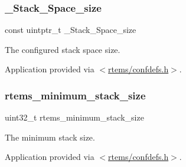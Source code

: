 \subsubsection{\texorpdfstring{\_Stack\_Space\_size}{\_Stack\_Space\_size}}
{\footnotesize\ttfamily const uintptr\+\_\+t \+\_\+\+Stack\+\_\+\+Space\+\_\+size}



The configured stack space size. 

Application provided via $<$\mbox{\hyperlink{confdefs_8h}{rtems/confdefs.\+h}}$>$. \mbox{\label{group__RTEMSScoreStack_gae18af1b30b702cd1f139f7df0d54acf4}} 
\subsubsection{\texorpdfstring{rtems\_minimum\_stack\_size}{rtems\_minimum\_stack\_size}}
{\footnotesize\ttfamily uint32\+\_\+t rtems\+\_\+minimum\+\_\+stack\+\_\+size}



The minimum stack size. 

Application provided via $<$\mbox{\hyperlink{confdefs_8h}{rtems/confdefs.\+h}}$>$. 